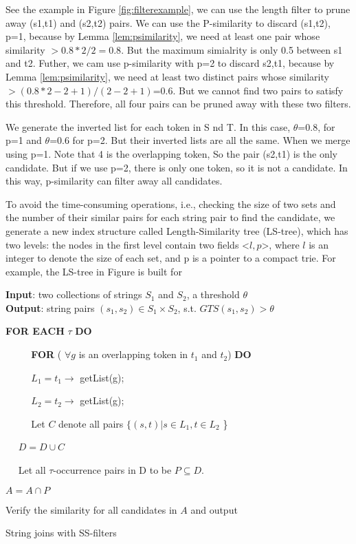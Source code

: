 \begin{example} See the example in Figure \ref{fig:filterexample}, we can use the length filter to prune away (s1,t1) and (s2,t2) pairs. We can use the P-similarity to discard (s1,t2), p=1, because by Lemma \ref{lem:psimilarity}, we need at least one pair whose similarity $> 0.8*2/2 = 0.8$. But the maximum simialrity is only 0.5 between s1 and t2. Futher, we cam use p-similarity with p=2 to discard s2,t1, because by Lemma \ref{lem:psimilarity}, we need at least two distinct pairs whose similarity $> (0.8*2-2+1)/(2-2+1)$=0.6. But we cannot find two pairs to satisfy this threshold. Therefore, all four pairs can be pruned away with these two filters.

 We generate the inverted list for each token in S nd T. In this case, $\theta$=0.8, for p=1 and $\theta$=0.6 for p=2. But their inverted lists are all the same. When we merge using p=1. Note that 4 is the overlapping token, So the pair (s2,t1) is the only candidate. But if we use p=2, there is only one token, so it is not a candidate. In this way, p-similarity can filter away all candidates.
\end{example}

To avoid the time-consuming operations, i.e., checking the size of two sets and the number of their similar pairs for each string pair to find the candidate, we generate a new index structure called Length-Similarity tree (LS-tree), which has two levels: the nodes  in the first level contain two fields <$l,p$>, where $l$ is an integer to denote the size of each set, and p is a pointer to a compact trie. For example, the LS-tree in Figure is built for

\begin{algorithm}
{\bf Input}: two collections of strings $S_1$ and $S_2$,  a threshold $\theta$ \\
{\bf Output}: string pairs $(s_1,s_2) \in S_1 \times S_2$, s.t. $GTS(s_1, s_2) > \theta$
\begin{compactenum}[(1)]
\item  {\bf FOR EACH} $\tau$ {\bf DO}
\item  ~~ ~~ {\bf FOR} ( $\forall g$ is an overlapping token in $t_1$ and $t_2$) {\bf DO}
\item  ~~ ~~ $L_1 = t_1 \rightarrow$ getList(g);
\item  ~~ ~~ $L_2 = t_2 \rightarrow$ getList(g);
\item  ~~ ~~ Let $C$ denote all pairs $\{(s,t)| s \in L_1, t\in L_2$ \}
\item  ~~  $D = D \cup C$
\item  ~~  Let all $\tau$-occurrence pairs  in D to be $P \subseteq D$.
\item   $A = A \cap P$
\item Verify the similarity for all candidates in $A$ and output
\end{compactenum}
\caption{String joins with SS-filters}
\label{alg:LSTreeJoin}
\end{algorithm}





